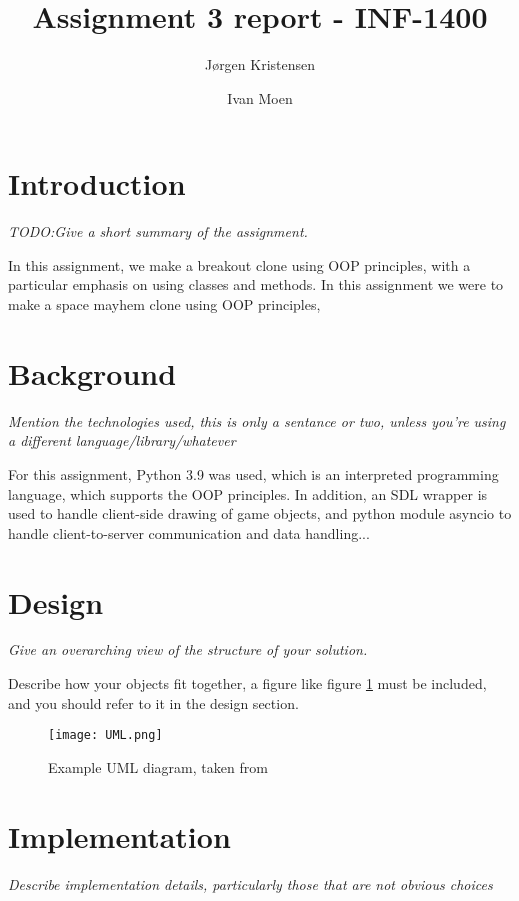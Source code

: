 \documentclass[11pt]{article}
\title{Assignment 3 report - INF-1400}
\author{Jørgen Kristensen \and Ivan Moen}
\begin{document}
\maketitle

\section{Introduction}

\emph{TODO:Give a short summary of the assignment.}

In this assignment, we make a breakout clone using OOP principles, with a particular emphasis on using classes and methods.
In this assignment we were to make a space mayhem clone using OOP principles,

\section{Background}

\emph{Mention the technologies used, this is only a sentance or two, unless you're using a different language/library/whatever}

For this assignment, Python 3.9\cite{python} was used, which is an interpreted programming language, which supports the OOP principles. In addition, an SDL wrapper is used to handle client-side drawing of game objects, and python module asyncio to handle client-to-server communication and data handling...

\section{Design}

\emph{Give an overarching view of the structure of your solution.}

Describe how your objects fit together, a figure like figure \ref{umlfig} must be included, and you should refer to it in the design section.

\begin{figure}[h]
	\centering
	\texttt{[image: UML.png]}
	\caption{Example UML diagram, taken from \cite{umlsource}}
	\label{umlfig}
\end{figure}

\section{Implementation}

\emph{Describe implementation details, particularly those that are not obvious choices}
\end{document}
